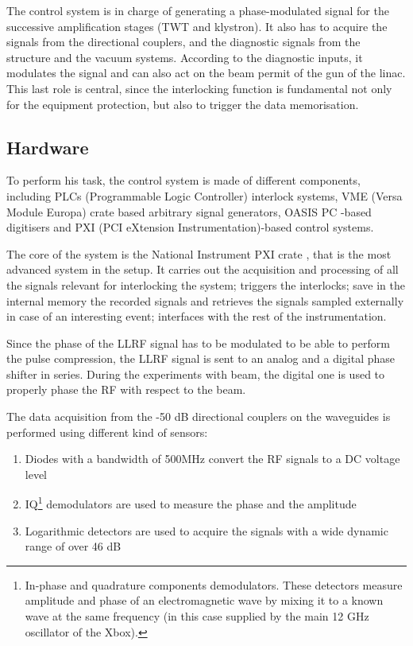 The control system is in charge of generating a phase-modulated signal for the successive amplification stages (TWT and klystron). It also has to acquire the signals from the directional couplers, and the diagnostic signals from the structure and the vacuum systems. According to the diagnostic inputs, it modulates the signal and can also act on the beam permit of the gun of the linac. This last role is central, since the interlocking function is fundamental not only for the equipment protection, but also to trigger the data memorisation. 


\subsection[Hardware]{Hardware}

To perform his task, the control system is made of different components, including PLCs (Programmable Logic Controller) interlock systems,  VME (Versa Module Europa) crate based arbitrary signal generators, OASIS PC \cite{OASIS}-based digitisers and PXI (PCI eXtension Instrumentation)-based control systems.

The core of the system is the National Instrument PXI crate \cite{NI:PXI}, that is the most advanced system in the setup. It carries out the acquisition and processing of all the signals relevant for interlocking the system; triggers the interlocks; save in the internal memory the recorded signals and retrieves the signals sampled externally in case of an interesting event; interfaces with the rest of the instrumentation.

Since the phase of the LLRF signal has to be modulated to be able to perform the pulse compression, the LLRF signal is sent to an analog and a digital phase shifter in series. During the experiments with beam, the digital one is used to properly phase the RF with respect to the beam.

The data acquisition from the -50 dB directional couplers on the waveguides is performed using different kind of sensors:
\begin{enumerate}
\item Diodes with a bandwidth of 500MHz convert the RF signals to a DC voltage level
\item IQ\footnote{In-phase and quadrature components demodulators. These detectors measure amplitude and phase of an electromagnetic wave by mixing it to a known wave at the same frequency (in this case supplied by the main 12 GHz oscillator of the Xbox).} demodulators are used to measure the phase and the amplitude
\item Logarithmic detectors are used to acquire the signals with a wide dynamic range of over 46 dB
\end{enumerate}

